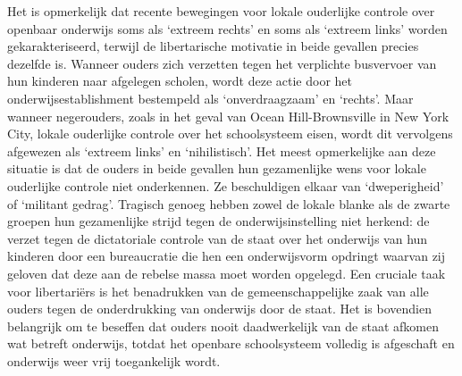 \documentclass[
  a5paper,
  smalldemyvopaper,10pt,twoside,onecolumn,openright,extrafontsizes,hidelinks]{memoir}
\begin{document}
Het is opmerkelijk dat recente bewegingen voor lokale ouderlijke
controle over openbaar onderwijs soms als `extreem rechts' en soms als
`extreem links' worden gekarakteriseerd, terwijl de libertarische
motivatie in beide gevallen precies dezelfde is. Wanneer ouders zich
verzetten tegen het verplichte busvervoer van hun kinderen naar
afgelegen scholen, wordt deze actie door het onderwijsestablishment
bestempeld als `onverdraagzaam' en `rechts'. Maar wanneer negerouders,
zoals in het geval van Ocean Hill-Brownsville in New York City, lokale
ouderlijke controle over het schoolsysteem eisen, wordt dit vervolgens
afgewezen als `extreem links' en `nihilistisch'. Het meest opmerkelijke
aan deze situatie is dat de ouders in beide gevallen hun gezamenlijke
wens voor lokale ouderlijke controle niet onderkennen. Ze beschuldigen
elkaar van `dweperigheid' of `militant gedrag'. Tragisch genoeg hebben
zowel de lokale blanke als de zwarte groepen hun gezamenlijke strijd
tegen de onderwijsinstelling niet herkend: de verzet tegen de
dictatoriale controle van de staat over het onderwijs van hun kinderen
door een bureaucratie die hen een onderwijsvorm opdringt waarvan zij
geloven dat deze aan de rebelse massa moet worden opgelegd. Een cruciale
taak voor libertariërs is het benadrukken van de gemeenschappelijke zaak
van alle ouders tegen de onderdrukking van onderwijs door de staat. Het
is bovendien belangrijk om te beseffen dat ouders nooit daadwerkelijk
van de staat afkomen wat betreft onderwijs, totdat het openbare
schoolsysteem volledig is afgeschaft en onderwijs weer vrij toegankelijk
wordt.
\end{document}
